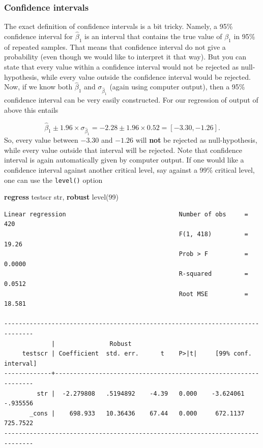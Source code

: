 \documentclass[
]{book}
\newenvironment{Shaded}{\begin{snugshade}}{\end{snugshade}}
\newcommand{\DecValTok}[1]{\textcolor[rgb]{0.00,0.00,0.81}{#1}}
\newcommand{\KeywordTok}[1]{\textcolor[rgb]{0.13,0.29,0.53}{\textbf{#1}}}
\newcommand{\NormalTok}[1]{#1}
\begin{document}
\hypertarget{confidence-intervals}{%
\subsubsection{Confidence intervals}\label{confidence-intervals}}

The exact definition of confidence intervals is a bit tricky. Namely, a 95\% confidence interval for \(\hat{\beta}_1\) is an interval that contains the true value of \(\beta_1\) in 95\% of repeated samples. That means that confidence interval do not give a probability (even though we would like to interpret it that way). But you can state that every value within a confidence interval would not be rejected as null-hypothesis, while every value outside the confidence interval would be rejected. Now, if we know both \(\hat{\beta}_1\) and \(\sigma_{\hat{\beta}_1}\) (again using computer output), then a 95\% confidence interval can be very easily constructed. For our regression of output of above this entails

\begin{equation}
\hat{\beta}_1 \pm 1.96 \times \sigma_{\hat{\beta}_1} = -2.28 \pm 1.96 \times 0.52 = [-3.30, -1.26].
\label{eq:olsci}
\end{equation}
So, every value between \(-3.30\) and \(-1.26\) will \textbf{not} be rejected as null-hypothesis, while every value outside that interval will be rejected. Note that confidence interval is again automatically given by computer output. If one would like a confidence interval against another critical level, say against a 99\% critical level, one can use the \texttt{level()} option

\begin{Shaded}
\begin{Highlighting}[]
\KeywordTok{regress}\NormalTok{ testscr str, }\KeywordTok{robust} \DecValTok{level}\NormalTok{(99)}
\end{Highlighting}
\end{Shaded}

\begin{verbatim}
Linear regression                               Number of obs     =        420
                                                F(1, 418)         =      19.26
                                                Prob > F          =     0.0000
                                                R-squared         =     0.0512
                                                Root MSE          =     18.581

------------------------------------------------------------------------------
             |               Robust
     testscr | Coefficient  std. err.      t    P>|t|     [99% conf. interval]
-------------+----------------------------------------------------------------
         str |  -2.279808   .5194892    -4.39   0.000    -3.624061    -.935556
       _cons |    698.933   10.36436    67.44   0.000     672.1137    725.7522
------------------------------------------------------------------------------
\end{verbatim}
\end{document}
